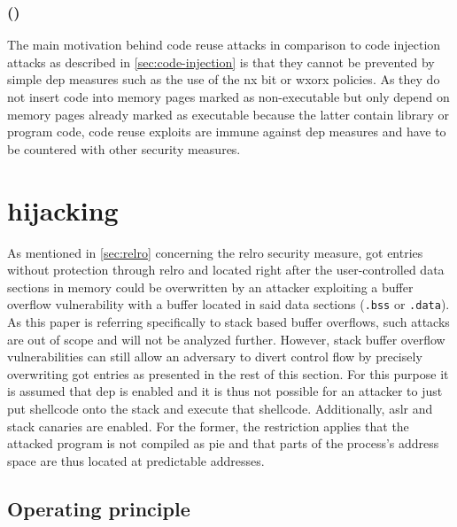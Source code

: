 \subsubsection{ ()}
\label{subsubsec:cr-dep}

The main motivation behind code reuse attacks in comparison to code injection attacks as described in \cref{sec:code-injection} is that they cannot be prevented by simple \gls{dep} measures such as the use of the \gls{nx} bit or \gls{wxorx} policies.
As they do not insert code into memory pages marked as non-executable but only depend on memory pages already marked as executable because the latter contain library or program code, code reuse exploits are immune against \gls{dep} measures and have to be countered with other security measures.

\section{ hijacking}
\label{sec:got-hijacking}

As mentioned in \cref{sec:relro} concerning the \gls{relro} security measure, \gls{got} entries without protection through \gls{relro} and located right after the user-controlled data sections in memory could be overwritten by an attacker exploiting a buffer overflow vulnerability with a buffer located in said data sections (\texttt{.bss} or \texttt{.data}).
As this paper is referring specifically to stack based buffer overflows, such attacks are out of scope and will not be analyzed further.
However, stack buffer overflow vulnerabilities can still allow an adversary to divert control flow by precisely overwriting \gls{got} entries as presented in the rest of this section.
For this purpose it is assumed that \gls{dep} is enabled and it is thus not possible for an attacker to just put shellcode onto the stack and execute that shellcode.
Additionally, \gls{aslr} and stack canaries are enabled.
For the former, the restriction applies that the attacked program is not compiled as \gls{pie} and that parts of the process's address space are thus located at predictable addresses.

\subsection{Operating principle}
\label{subsec:got-operating-principle}

